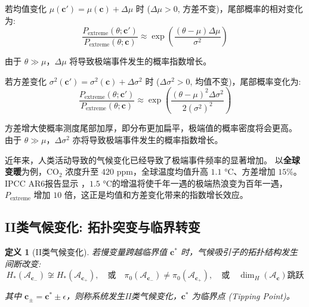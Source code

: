 \documentclass[12pt, a4paper]{article}
\newtheorem{definition}{定义}[section]
\newcommand{\attractor}{\mathcal{A}}
\newcommand{\slowvar}{\bm{c}}          %
\newcommand{\meanval}{\mu}          %
\newcommand{\variance}{\sigma^2}    %
\newcommand{\threshold}{\theta}  %
\begin{document}
若均值变化 $\meanval(\slowvar') = \meanval(\slowvar) + \Delta \meanval$ 时 ($\Delta \meanval > 0$, 方差不变)，尾部概率的相对变化为:
\begin{equation}
\label{eq:extreme_prob_mean_shift}
    \frac{P_{\text{extreme}}(\threshold; \slowvar')}{P_{\text{extreme}}(\threshold; \slowvar)} \approx \exp\left(\frac{(\threshold - \meanval)\Delta \meanval}{\variance}\right)
\end{equation}

由于 $\threshold \gg \meanval$，$\Delta \meanval$ 将导致极端事件发生的概率指数增长。

若方差变化 $\variance(\slowvar') = \variance(\slowvar) + \Delta \variance$ 时 ($\Delta \variance > 0$, 均值不变)，尾部概率变化为:
\begin{equation}
\label{eq:extreme_prob_variance_increase}
    \frac{P_{\text{extreme}}(\threshold; \slowvar')}{P_{\text{extreme}}(\threshold; \slowvar)} \approx \exp\left(\frac{(\threshold - \meanval)^2 \Delta \variance}{2(\variance)^2}\right)
\end{equation}

方差增大使概率测度尾部加厚，即分布更加扁平，极端值的概率密度将会更高。
由于 $\threshold \gg \meanval$，$\Delta \variance$ 亦将导致极端事件发生的概率指数增长。

近年来，人类活动导致的气候变化已经导致了极端事件频率的显著增加。
以\textbf{全球变暖}为例，$\text{CO}_2$ 浓度升至 $420$ ppm，全球温度均值升高 $1.1$ °C、方差增加 $15\%$。
IPCC AR6报告显示 \cite{ipcc2021ar6}，$1.5$ °C的增温将使千年一遇的极端热浪变为百年一遇，$P_{\text{extreme}}$ 增加 $10$ 倍，这正是均值和方差变化带来的指数增长效应。

\subsection{II类气候变化: 拓扑突变与临界转变}

\begin{definition}[II类气候变化]
\label{def:type2_climate}
    若慢变量跨越临界值 $\slowvar^*$ 时，气候吸引子的拓扑结构发生间断改变:
    \begin{equation}
        H_*(\attractor_{\slowvar_-}) \not\cong H_*(\attractor_{\slowvar_+}), \quad \text{或} \quad \pi_0(\attractor_{\slowvar_-}) \neq \pi_0(\attractor_{\slowvar_+}), \quad \text{或} \quad \dim_H(\attractor_{\slowvar}) \text{跳跃}
    \end{equation}

    其中 $\slowvar_{\pm} = \slowvar^* \pm \epsilon$，则称系统发生II类气候变化，$\slowvar^*$ 为临界点 (Tipping Point)。
\end{definition}
\end{document}
